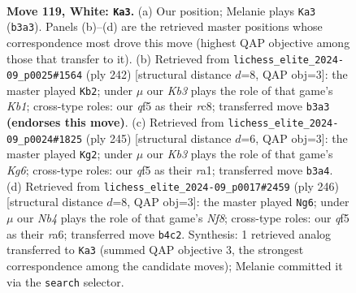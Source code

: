\documentclass[11pt]{article}
\begin{document}
\clearpage

\begin{figure}[p]\centering
\begin{subfigure}{0.46\textwidth}\centering
\resizebox{\linewidth}{!}{%
\newchessgame
\chessboard[
  setfen={3B4/1k6/8/5q2/1N6/1K6/8/8 w - - 6 119},
  showmover=false,
  pgfstyle=straightmove, color=movearrow, markmove={b3-a3}
]}
\caption{}
\end{subfigure}\hfill
\begin{subfigure}{0.46\textwidth}\centering
\resizebox{\linewidth}{!}{%
\newchessgame
\chessboard[
  setfen={2r5/8/8/8/8/8/N2k4/1K6 w - - 98 122},
  showmover=false,
  pgfstyle=straightmove, color=movearrow, markmove={b1-b2}
]}
\caption{}
\end{subfigure}
\\[4pt]
\begin{subfigure}{0.46\textwidth}\centering
\resizebox{\linewidth}{!}{%
\newchessgame
\chessboard[
  setfen={8/8/8/8/8/4K1kn/8/R7 b - - 5 123},
  showmover=false,
  pgfstyle=straightmove, color=movearrow, markmove={g3-g2}
]}
\caption{}
\end{subfigure}\hfill
\begin{subfigure}{0.46\textwidth}\centering
\resizebox{\linewidth}{!}{%
\newchessgame
\chessboard[
  setfen={5N2/6K1/r7/8/4k3/8/8/8 w - - 96 124},
  showmover=false,
  pgfstyle=straightmove, color=movearrow, markmove={f8-g6}
]}
\caption{}
\end{subfigure}
\caption{\textbf{Move 119, White: \texttt{Ka3}.} (a) Our position; Melanie plays \texttt{Ka3} (\texttt{b3a3}). Panels (b)--(d) are the retrieved master positions whose correspondence most drove this move (highest QAP objective among those that transfer to it). (b) Retrieved from \texttt{lichess\_elite\_2024-09\_p0025\#1564} (ply 242) [structural distance $d$=8, QAP obj=3]: the master played \texttt{Kb2}; under $\mu$ our \emph{Kb3} plays the role of that game's \emph{Kb1}; cross-type roles: our \emph{q}f5 as their \emph{r}c8; transferred move \texttt{b3a3} \textbf{(endorses this move)}. (c) Retrieved from \texttt{lichess\_elite\_2024-09\_p0024\#1825} (ply 245) [structural distance $d$=6, QAP obj=3]: the master played \texttt{Kg2}; under $\mu$ our \emph{Kb3} plays the role of that game's \emph{Kg6}; cross-type roles: our \emph{q}f5 as their \emph{r}a1; transferred move \texttt{b3a4}. (d) Retrieved from \texttt{lichess\_elite\_2024-09\_p0017\#2459} (ply 246) [structural distance $d$=8, QAP obj=3]: the master played \texttt{Ng6}; under $\mu$ our \emph{Nb4} plays the role of that game's \emph{Nf8}; cross-type roles: our \emph{q}f5 as their \emph{r}a6; transferred move \texttt{b4c2}. Synthesis: 1 retrieved analog transferred to \texttt{Ka3} (summed QAP objective 3, the strongest correspondence among the candidate moves); Melanie committed it via the \texttt{search} selector.}
\label{fig:thought-m236}
\end{figure}
\end{document}
